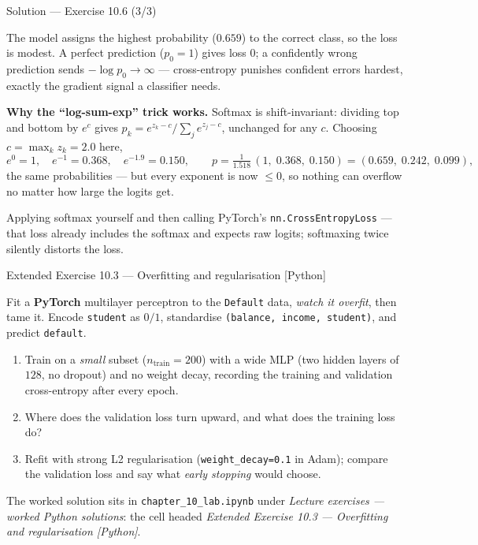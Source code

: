 \documentclass[aspectratio=169,11pt]{beamer}
\begin{document}
\begin{frame}{Solution --- Exercise 10.6 (3/3)}
\begin{solutionbox}
  The model assigns the highest probability ($0.659$) to the correct
  class, so the loss is modest. A perfect prediction ($p_0 = 1$)
  gives loss $0$; a confidently wrong prediction sends
  $-\log p_0 \to \infty$ --- cross-entropy punishes confident errors
  hardest, exactly the gradient signal a classifier needs.

  \medskip
  \textbf{Why the ``log-sum-exp'' trick works.} Softmax is shift-invariant:
  dividing top and bottom by $e^{c}$ gives $p_k = e^{z_k - c}/\sum_j e^{z_j - c}$,
  unchanged for any $c$. Choosing $c = \max_k z_k = 2.0$ here,
  \[
    e^{0} = 1,\quad e^{-1} = 0.368,\quad e^{-1.9} = 0.150,\qquad
    p = \tfrac{1}{1.518}\,(1,\; 0.368,\; 0.150) = (0.659,\; 0.242,\; 0.099),
  \]
  the same probabilities --- but every exponent is now $\le 0$, so nothing
  can overflow no matter how large the logits get.

\end{solutionbox}
\begin{mistake}
  Applying softmax yourself and then calling PyTorch's
  \texttt{nn.CrossEntropyLoss} --- that loss already includes the softmax and
  expects raw logits; softmaxing twice silently distorts the loss.
\end{mistake}
\end{frame}

\begin{frame}{Extended Exercise 10.3 --- Overfitting and regularisation [Python]}
\begin{longexercise}
  Fit a \textbf{PyTorch} multilayer perceptron to the \texttt{Default} data,
  \emph{watch it overfit}, then tame it. Encode \texttt{student} as $0/1$, standardise
  \texttt{(balance, income, student)}, and predict \texttt{default}.
  \begin{enumerate}
    \item Train on a \emph{small} subset ($n_{\text{train}}=200$) with a wide MLP
          (two hidden layers of $128$, no dropout) and no weight decay, recording the
          training and validation cross-entropy after every epoch.
    \item Where does the validation loss turn upward, and what does the training loss do?
    \item Refit with strong L2 regularisation
          (\texttt{weight\_decay=0.1} in Adam); compare the validation
          loss and say what \emph{early stopping} would choose.
  \end{enumerate}
\end{longexercise}
\begin{labnote}
  The worked solution sits in \texttt{chapter\_10\_lab.ipynb} under
  \emph{Lecture exercises --- worked Python solutions}: the cell headed
  \emph{Extended Exercise 10.3 --- Overfitting and regularisation [Python]}.
\end{labnote}
\end{frame}
\end{document}

